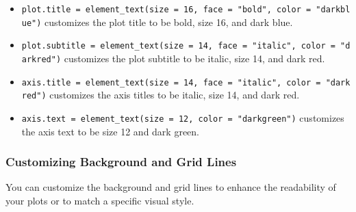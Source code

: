 \documentclass[
]{book}
\begin{document}
\begin{itemize}
\item
  \texttt{plot.title\ =\ element\_text(size\ =\ 16,\ face\ =\ "bold",\ color\ =\ "darkblue")} customizes the plot title to be bold, size 16, and dark blue.
\item
  \texttt{plot.subtitle\ =\ element\_text(size\ =\ 14,\ face\ =\ "italic",\ color\ =\ "darkred")} customizes the plot subtitle to be italic, size 14, and dark red.
\item
  \texttt{axis.title\ =\ element\_text(size\ =\ 14,\ face\ =\ "italic",\ color\ =\ "darkred")} customizes the axis titles to be italic, size 14, and dark red.
\item
  \texttt{axis.text\ =\ element\_text(size\ =\ 12,\ color\ =\ "darkgreen")} customizes the axis text to be size 12 and dark green.
\end{itemize}

\hypertarget{customizing-background-and-grid-lines}{%
\subsubsection*{Customizing Background and Grid Lines}\label{customizing-background-and-grid-lines}}

You can customize the background and grid lines to enhance the readability of your plots or to match a specific visual style.
\end{document}
